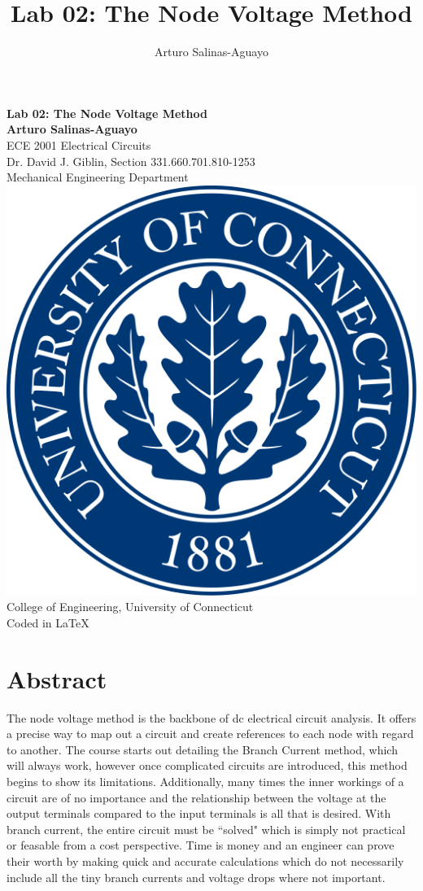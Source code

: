 \documentclass[12pt]{article}
\author{Arturo Salinas-Aguayo}
\title{Lab 02: The Node Voltage Method}
\begin{document}
\newcommand{\closure}[2][3]{%
	{}\mkern#1mu\overline{\mkern-#1mu#2}}
\newcommand\ncoverline[1]{\mkern1mu\overline{\mkern-1mu#1\mkern-1mu}\mkern1mu}
\begin{titlepage}
	\centering
	\vspace*{3cm}
	\huge\textbf{Lab 02: The Node Voltage Method}\\
	\vspace{5cm}
	\Large\textbf{Arturo Salinas-Aguayo}\\
	\normalsize
	ECE 2001 Electrical Circuits\\
	Dr. David J. Giblin, Section 331.660.701.810-1253\\
	Mechanical Engineering Department
	\vfill
	\includegraphics[scale=0.1]{uconnlogo}\\
	College of Engineering, University of Connecticut\\
	\scriptsize{Coded in \LaTeX}
	\vspace*{1cm}
\end{titlepage}
\tableofcontents
\newpage
\section{Abstract}
The node voltage method is the backbone of dc electrical circuit analysis. It
offers a precise way to map out a circuit and create references to each node
with regard to another. The course starts out detailing the Branch Current
method, which will always work, however once complicated circuits are
introduced, this method begins to show its limitations. Additionally, many times
the inner workings of a circuit are of no importance and the relationship
between the voltage at the output terminals compared to the input terminals is
all that is desired. With branch current, the entire circuit must be ``solved"
which is simply not practical or feasable from a cost perspective. Time is money
and an engineer can prove their worth by making quick and accurate calculations
which do not necessarily include all the tiny branch currents and voltage drops
where not important.
\newpage
\end{document}
